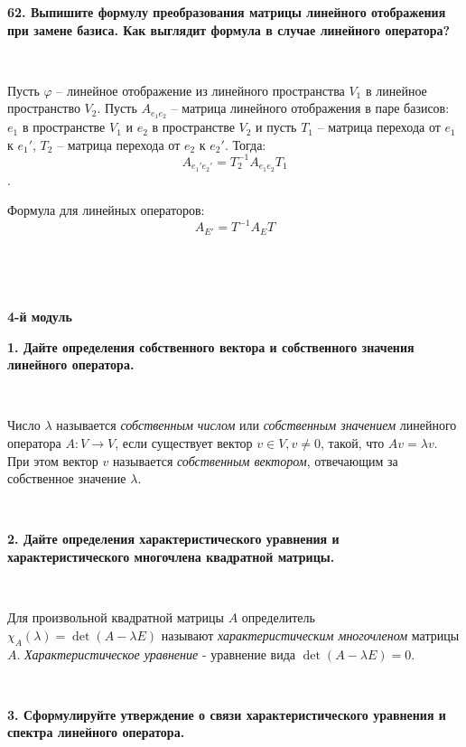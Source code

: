 \documentclass{article}
\begin{document}
	\textbf{62. Выпишите формулу преобразования матрицы линейного отображения при замене базиса. Как выглядит формула в случае линейного оператора?}
	
	{
		$\;$
		\setlength{\parindent}{0.4cm}
		\hangindent=0.4cm
		
		Пусть $\varphi$ -- линейное отображение из линейного пространства $V_1$ в линейное пространство $V_2$. Пусть $A_{e_1e_2}$ -- матрица линейного отображения в паре базисов: $e_1$  в пространстве $V_1$ и $e_2$ в пространстве $V_2$ и пусть $T_1$ -- матрица перехода от $e_1$ к $e_1'$, $T_2$ -- матрица перехода от $e_2$ к $e_2'$. Тогда: $$A_{e_1'e_2'}=T_2^{-1}A_{e_1e_2}T_1$$. 
		
		Формула для линейных операторов: $$A_{E'}=T^{-1}A_ET$$
		
		$\;$
		\setlength{\parindent}{0cm}
		\hangindent=0cm
	}
	
	\Large
	\centering
	
	$\;$
	
	\textbf{4-й модуль}
	
	\flushleft
	\small
	
	\textbf{1. Дайте определения собственного вектора и собственного значения линейного оператора.}
	
	$\;$
	{
		\setlength{\parindent}{0.4cm}
		\hangindent=0.4cm
		
		Число $\lambda$ называется \textit{собственным числом} или \textit{собственным значением} линейного оператора $A:V\rightarrow V$, если существует вектор $v\in V, v \not = 0$, такой, что $Av=\lambda v$. При этом вектор $v$ называется \textit{собственным вектором}, отвечающим за собственное значение $\lambda$.
		
		$\;$
		\setlength{\parindent}{0cm}
		\hangindent=0cm
	}
	
	\textbf{2. Дайте определения характеристического уравнения и характеристического многочлена квадратной матрицы.}
	
	$\;$
	{
		\setlength{\parindent}{0.4cm}
		\hangindent=0.4cm
		
		Для произвольной квадратной матрицы $A$ определитель $\chi_A(\lambda) = \det(A-\lambda E)$ называют \textit{характеристическим многочленом} матрицы $A$. \textit{Характеристическое уравнение} - уравнение вида $\det(A-\lambda E) = 0.$ 
		
		$\;$
		\setlength{\parindent}{0cm}
		\hangindent=0cm
	}
	
	\textbf{3. Сформулируйте утверждение о связи характеристического уравнения и спектра линейного оператора.}
	
\end{document}

